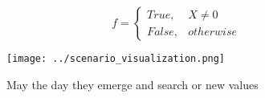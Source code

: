 \documentclass[a4paper]{article}
\begin{document}
\begin{equation}   f =
\begin{cases} True, & X \neq 0\\
False, & otherwise
\end{cases}
\end{equation}

\begin{figure}
\centering
\texttt{[image: ../scenario\_visualization.png]}
\caption{May the day they emerge and search or new values 
}
\end{figure}
 
\end{document}
